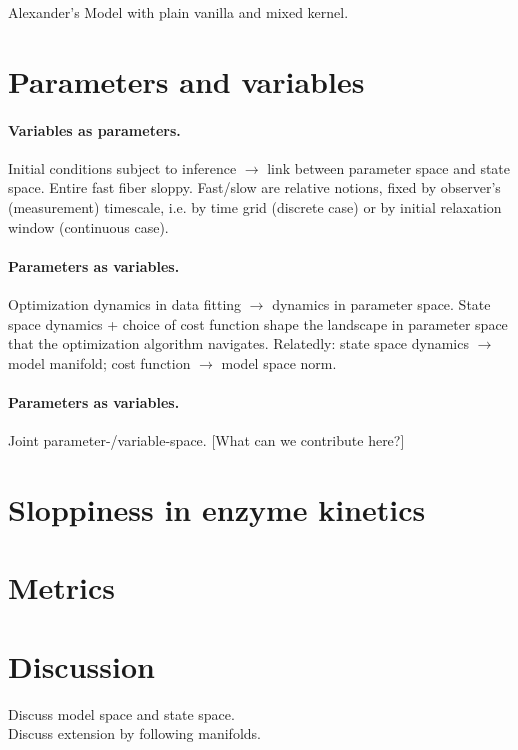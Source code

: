 \documentclass{article}
\begin{document}
Alexander's Model with plain vanilla and mixed kernel.

\section{Parameters and variables}

\paragraph{Variables as parameters.}
Initial conditions subject to inference $\rightarrow$ link between
parameter space and state space.  Entire fast fiber sloppy.  Fast/slow
are relative notions, fixed by observer's (measurement) timescale,
i.e. by time grid (discrete case) or by initial relaxation window
(continuous case).

\paragraph{Parameters as variables.}
Optimization dynamics in data fitting $\rightarrow$ dynamics in
parameter space. State space dynamics + choice of cost function shape
the landscape in parameter space that the optimization algorithm
navigates.  Relatedly: state space dynamics $\rightarrow$ model
manifold; cost function $\rightarrow$ model space norm.

\paragraph{Parameters as variables.}
Joint parameter-/variable-space.
[What can we contribute here?]


\section{Sloppiness in enzyme kinetics}




\section{Metrics}


\section{Discussion}

Discuss model space and state space.\\

Discuss extension by following manifolds.\\
\end{document}
